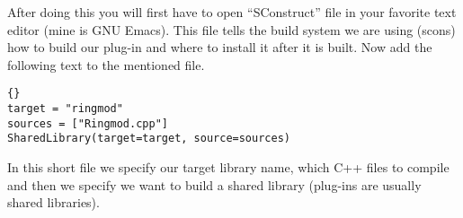 \documentclass[a4paper, 12pt]{article}
\begin{document}
After doing this you will first have to open ``SConstruct'' file in
your favorite text editor (mine is GNU Emacs). This file tells the
build system we are using (scons) how to build our plug-in and where
to install it after it is built. Now add the following text to the
mentioned file. 

\lstset{language=Python}
\begin{lstlisting}[frame=trbl, caption=SConstruct]{}
target = "ringmod"
sources = ["Ringmod.cpp"]
SharedLibrary(target=target, source=sources)
\end{lstlisting}

In this short file we specify our target library name, which C++ files
to compile and then we specify we want to build a shared library
(plug-ins are usually shared libraries).
\end{document}
